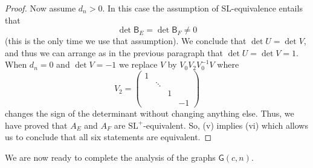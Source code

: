\documentclass[12pt]{amsbook}%
\newcommand{\BB}{\mathsf B}
\theoremstyle{defin}
\theoremstyle{remark}
\numberwithin{equation}{chapter}
\numberwithin{theor}{section}
\newcommand{\GO}{{\mathsf G}}
\begin{document}
\begin{proof}
Now assume $d_n>0$. In this case the assumption of SL-equivalence entails that
\[\det \BB_E=\det \BB_F\not=0
\]
(this is the only time we use that assumption). 
 We conclude that $\det U=\det V$, and thus we can arrange as in the previous paragraph that $\det U=\det V=1$.  When  $d_n=0$ and $\det V=-1$ we replace $V$ by $V_0V_2V_0^{-1}V$ where
\[
V_2=\begin{pmatrix}1&&&\\&\ddots&&\\&&1&\\&&&-1\end{pmatrix}
\]
changes the sign of the determinant without changing anything else.  Thus, we have proved that $A_E$ and $A_F$ are $\mathrm{SL}^+$-equivalent.  So, (v) implies (vi) which allows us to conclude that all six statements are equivalent.  
  \end{proof}
  
  We are now ready to complete the analysis of the graphs $\GO(c,n)$.\\
  
\end{document}
